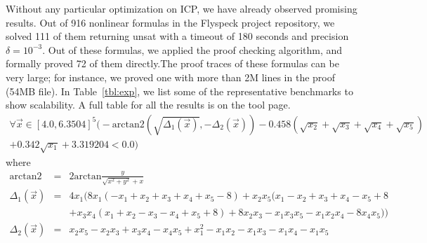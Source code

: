 Without any particular optimization on ICP, we have already observed
promising results. Out of 916 nonlinear formulas in the Flyspeck
project repository, we solved 111 of them returning {\sf unsat} with a
timeout of 180 seconds and precision $\delta=10^{-3}$. Out of these
formulas, we applied the proof checking algorithm, and formally proved
72 of them directly.The proof traces of these formulas can be very
large; for instance, we proved one with more than 2M lines in the
proof (54MB file). In Table~\ref{tbl:exp}, we list some of the
representative benchmarks to show scalability. A full table for all
the results is on the tool page.
\begin{multline*}
\forall\vec{x} \in [4.0, 6.3504]^5\Big(- \mathrm{arctan2}(\sqrt{\Delta_1(\vec{x})}, - \Delta_2(\vec{x})) - 0.458(\sqrt{x_2} + \sqrt{x_3} +\sqrt{x_4} + \sqrt{x_5})\\
 + 0.342\sqrt{x_1} + 3.319204 < 0.0\Big)
\end{multline*}
where
\begin{eqnarray*}
\mathrm{arctan2} &=& 2 \mathrm{arctan} \frac{y}{\sqrt{x^2 + y^2} + x}\\
  \Delta_1(\vec{x}) &=& 4x_1 (8x_1 (-x_1 + x_2 + x_3 + x_4 + x_5 - 8) + x_2 x_5 (x_1 - x_2 + x_3 + x_4 - x_5+8\\%
& &+ x_3x_4(x_1 + x_2 - x_3 - x_4 + x_5 + 8)+ 8 x_2 x_3 - x_1 x_3 x_5 - x_1  x_2  x_4 - 8 x_4 x_5))\\
\Delta_2(\vec{x}) &=& x_2 x_5 -x_2 x_3 + x_3x_4 - x_4 x_5 +x_1^2 -x_1x_2 - x_1x_3 - x_1x_4 -x_1 x_5
\end{eqnarray*}
